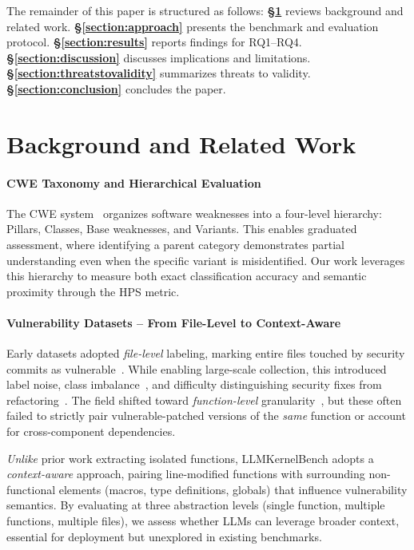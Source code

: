 \documentclass[lettersize,journal]{IEEEtran}
\begin{document}
The remainder of this paper is structured as follows: \textbf{\S\ref{section:related_work}} reviews background and related work. \textbf{\S\ref{section:approach}} presents the benchmark and evaluation protocol. \textbf{\S\ref{section:results}} reports findings for RQ1--RQ4. \textbf{\S\ref{section:discussion}} discusses implications and limitations. \textbf{\S\ref{section:threatstovalidity}} summarizes threats to validity. \textbf{\S\ref{section:conclusion}} concludes the paper.


\section{Background and Related Work}
\label{section:related_work}

\paragraph*{\gls{CWE} Taxonomy and Hierarchical Evaluation}
The \gls{CWE} system~\cite{mitre_cwe} organizes software weaknesses into a four-level hierarchy: Pillars, Classes, Base weaknesses, and Variants. This enables graduated assessment, where identifying a parent category demonstrates partial understanding even when the specific variant is misidentified. Our work leverages this hierarchy to measure both exact classification accuracy and semantic proximity through the \gls{HPS} metric.

\paragraph*{Vulnerability Datasets -- From File-Level to Context-Aware}
Early datasets adopted \emph{file-level} labeling, marking entire files touched by security commits as vulnerable~\cite{chakraborty2021deep, wang2021patchdb, zheng2021d2a, ni2024megavul}. While enabling large-scale collection, this introduced label noise, class imbalance~\cite{gao2023far}, and difficulty distinguishing security fixes from refactoring~\cite{iannone2022secret, croft2023data}. The field shifted toward \emph{function-level} granularity~\cite{zhou2019devign, bhandari2021cvefixes}, but these often failed to strictly pair vulnerable-patched versions of the \emph{same} function or account for cross-component dependencies.

\emph{Unlike} prior work extracting isolated functions, LLMKernelBench adopts a \emph{context-aware} approach, pairing line-modified functions with surrounding non-functional elements (macros, type definitions, globals) that influence vulnerability semantics. By evaluating at three abstraction levels (single function, multiple functions, multiple files), we assess whether \glspl{LLM} can leverage broader context, essential for deployment but unexplored in existing benchmarks.
\end{document}
